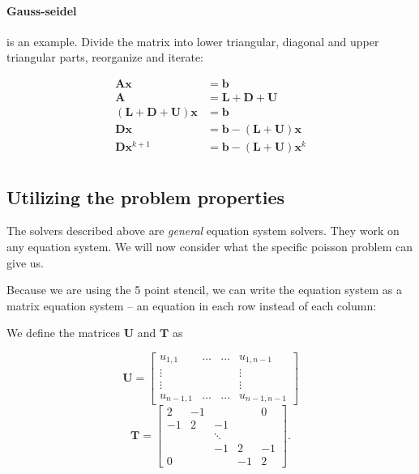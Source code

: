 \paragraph*{Gauss-seidel} is an example. Divide the matrix into lower triangular, diagonal and upper triangular parts, reorganize and iterate:

\begin{align}
  \mathbf{A} \mathbf{x} &= \mathbf{b} \\
  \mathbf{A} &= \mathbf{L} + \mathbf{D} + \mathbf{U} \\
  (\mathbf{L} + \mathbf{D} + \mathbf{U}) \mathbf{x} &= \mathbf{b} \\
  \mathbf{D} \mathbf{x} &= \mathbf{b} - (\mathbf{L} + \mathbf{U}) \mathbf{x} \\
  \mathbf{D} \mathbf{x}^{k+1} &= \mathbf{b} - (\mathbf{L} + \mathbf{U}) \mathbf{x}^{k} \\
\end{align}

\subsection{Utilizing the problem properties}
The solvers described above are \emph{general} equation system solvers. They work on any equation system. We will now consider what the specific poisson problem can give us.

Because we are using the 5 point stencil, we can write the equation system as a matrix equation system -- an equation in each row instead of each column:

We define the matrices $\mathbf{U}$ and $\mathbf{T}$ as

\begin{equation}
  \mathbf{{U}} = 
  \begin{bmatrix}
    u_{1,1} & \ldots & \ldots & u_{1,n-1} \\
    \vdots & & & \vdots \\
    \vdots & & & \vdots \\
    u_{n-1,1} & \ldots & \ldots & u_{n-1,n-1}
  \end{bmatrix}
\end{equation}
\begin{equation}
  \mathbf{{T}} = 
  \begin{bmatrix}
    2 & -1 & & & 0 \\
    -1 & 2 & -1 & & \\
    & & \ddots & & \\
    & & -1 & 2 & -1 \\
    0 & & & -1 & 2
  \end{bmatrix}.
\end{equation}

